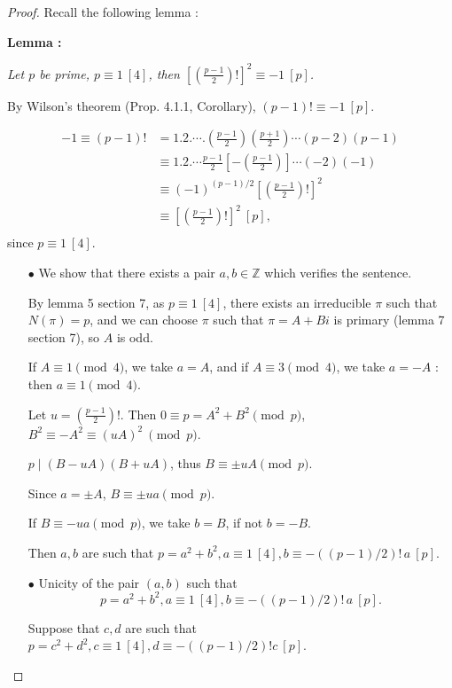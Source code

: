\documentclass[11pt,a4paper]{article}
\newcommand{\Z}{\mathbb{Z}}
\begin{document}
\begin{proof}
Recall the following lemma : 

{\bf Lemma :} 

{\it Let $p$ be  prime, $p \equiv 1 \ [4]$, then  $\left [ \left ( \frac{p-1}{2} \right)!\right ]^2 \equiv -1 \ [p]$.}

\medskip
 
By Wilson's theorem (Prop. 4.1.1, Corollary), $(p-1)! \equiv -1 \ [p]$.

\begin{align*}
-1 \equiv (p-1)! &= 1.2. \cdots .\left(\frac{p-1}{2}\right)\left(\frac{p+1}{2}\right)\cdots(p-2)(p-1)\\
&\equiv 1.2.\cdots\frac{p-1}{2}\left[-\left(\frac{p-1}{2}\right)\right]\cdots(-2)(-1) \\
&\equiv (-1)^{(p-1)/2} \left [ \left ( \frac{p-1}{2} \right)!\right ]^2 \\
&\equiv \left [ \left ( \frac{p-1}{2} \right)!\right ]^2 \ [p],\\
\end{align*}
since $p\equiv 1 \ [4]$.
\begin{enumerate}
\item[$\bullet$] We show that there exists a pair $a,b \in \Z$ which verifies the sentence.

By lemma 5 section 7, as $p \equiv 1 \ [4]$, there exists an irreducible $\pi$ such that $N(\pi) = p$, and we can choose $\pi$ such that $\pi = A + Bi$ is primary (lemma 7 section 7), so $A$ is odd.

If $A\equiv 1 \pmod 4$, we take $a=A$, and if $A \equiv 3 \pmod 4$, we take $a = -A$ : then $a \equiv 1 \pmod 4$.

Let $u = \left ( \frac{p-1}{2} \right)!$. Then $0 \equiv p = A^2 + B^2 \pmod p$,  $B^2 \equiv -A^2 \equiv (uA)^2 \ \pmod p$.

$p \mid (B-uA)(B+uA)$, thus $B \equiv \pm uA\pmod p$.

Since $a = \pm A$, $B \equiv \pm ua \pmod p$.

If $B \equiv -ua \pmod p$, we take $b = B$, if not $b = -B$. 

Then $a,b$ are such that $p=a^2+b^2, a\equiv 1 \ [4], b \equiv -((p-1)/2)!\, a\ [p]$.

\item[$\bullet$] Unicity of the pair $(a,b)$ such that
$$p=a^2+b^2, a\equiv 1 \ [4], b \equiv -((p-1)/2)!\, a\ [p].$$

Suppose that $c,d$ are such that $p = c^2+d^2,c\equiv 1 \ [4], d \equiv -((p-1)/2)! c \ [p]$.


\end{enumerate}
\end{proof}
\end{document}
